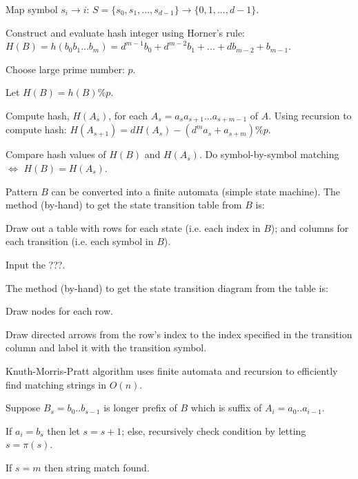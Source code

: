         \startitemize[n]
            \item Map symbol $s_{i} \rightarrow i$: $S = \{s_{0}, s_{1}, ..., s_{d-1}\} \rightarrow \{0, 1, ..., d-1\}$.
            \item Construct and evaluate hash integer using Horner's rule: $H(B) = h(b_{0}b_{1}...b_{m}) = d^{m-1}b_{0} + d^{m-2}b_{1} + ... + db_{m-2} + b_{m-1}$.
            \item Choose large prime number: $p$.
            \item Let $H(B) = h(B) \% p$.
            \item Compute hash, $H(A_{s})$, for each $A_{s} = a_{s}a_{s+1}...a_{s+m-1}$ of $A$. Using recursion to compute hash: $H(A_{s+1}) = dH(A_{s}) - (d^{m}a_{s} + a_{s + m}) \% p$.
            \item Compare hash values of $H(B)$ and $H(A_{s})$. Do symbol-by-symbol matching $\iff$ $H(B) = H(A_{s})$.
        \stopitemize


    Pattern $B$ can be converted into a finite automata (simple state machine). The method (by-hand) to get the state transition table from $B$ is:
    \startitemize[n]
        \item Draw out a table with rows for each state (i.e. each index in $B$); and columns for each transition (i.e. each symbol in $B$).
        \item Input the ???.
    \stopitemize

    The method (by-hand) to get the state transition diagram from the table is:
    \startitemize[n]
        \item Draw nodes for each row.
        \item Draw directed arrows from the row's index to the index specified in the transition column and label it with the transition symbol.
    \stopitemize


    Knuth-Morris-Pratt algorithm uses finite automata and recursion to efficiently find matching strings in $O(n)$.
    \startitemize[n]
        \item Suppose $B_{s} = b_{0}..b_{s-1}$ is longer prefix of $B$ which is suffix of $A_{i} = a_{0}..a_{i - 1}$.
        \item If $a_{i} = b_{s}$ then let $s = s + 1$; else, recursively check condition by letting $s = \pi(s)$.
        \item If $s = m$ then string match found.
    \stopitemize

